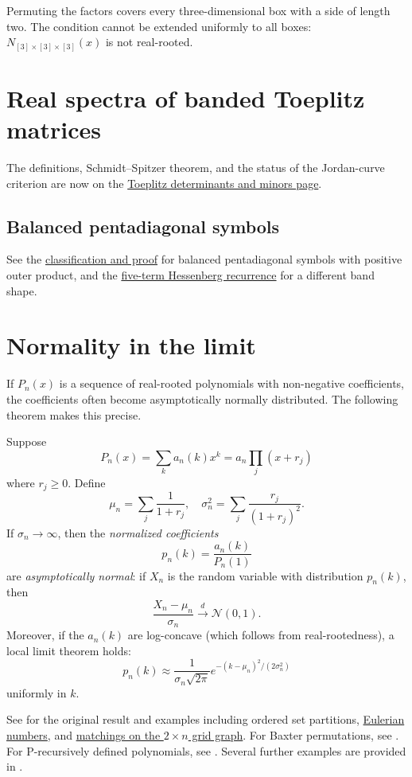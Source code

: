 Permuting the factors covers every three-dimensional box with a side of
length two.  The condition cannot be extended uniformly to all boxes:
$N_{[3]\times[3]\times[3]}(x)$ is not real-rooted.



\section[toeplitzRealSpectra]{Real spectra of banded Toeplitz matrices}

The definitions, Schmidt--Spitzer theorem, and the status of the
Jordan-curve criterion are now on the
\hyperref[toeplitzSpectra]{Toeplitz determinants and minors page}.

\subsection[balancedPentadiagonalSpectra]{Balanced pentadiagonal symbols}

See the \hyperref[toeplitzPentadiagonal]{classification and proof}
for balanced pentadiagonal symbols with positive outer product,
and the \hyperref[toeplitzHessenberg]{five-term Hessenberg recurrence}
for a different band shape.

\section[realRootedNormality]{Normality in the limit}

If $P_n(x)$ is a sequence of real-rooted polynomials with non-negative coefficients,
the coefficients often become asymptotically normally distributed.
The following theorem makes this precise.

\begin{theorem*}
Suppose
\[
P_n(x) = \sum_{k} a_n(k) x^k = a_n \prod_j (x + r_j)
\]
where $r_j \geq 0$. Define
\[
\mu_n = \sum_j \frac{1}{1 + r_j}, \quad \sigma_n^2 = \sum_j \frac{r_j}{(1 + r_j)^2}.
\]
If $\sigma_n \to \infty$, then the \emph{normalized coefficients}
\[
p_n(k) = \frac{a_n(k)}{P_n(1)}
\]
are \emph{asymptotically normal}: if $X_n$ is the random variable
with distribution $p_n(k)$, then
\[
\frac{X_n - \mu_n}{\sigma_n} \xrightarrow{d} \mathcal{N}(0,1).
\]
Moreover, if the $a_n(k)$ are log-concave (which follows from real-rootedness), a local limit theorem holds:
\[
p_n(k) \approx \frac{1}{\sigma_n \sqrt{2 \pi}} e^{ - (k - \mu_n)^2 / (2 \sigma_n^2) }
\]
uniformly in $k$.
\end{theorem*}

See \cite{Bender1973} for the original result and examples including ordered set partitions,
\hyperref[eulerianZeros]{Eulerian numbers},
and \hyperref[realRootedMatching]{matchings on the $2\times n$ grid graph}.
For Baxter permutations, see \cite{Zhao2024x}.
For P-recursively defined polynomials, see \cite{Li2025x}.
Several further examples are provided in \cite{Hitczenko2024x}.
